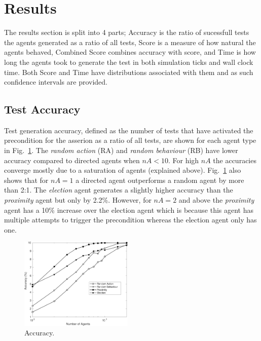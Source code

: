 \documentclass[letterpaper, 10 pt, journal, twoside]{IEEEtran}
\begin{document}
\section{Results}
The results section is split into 4 parts; Accuracy is the ratio of sucessfull tests the agents generated as a ratio of all tests, Score is a measure of how natural the agents behaved, Combined Score combines accuracy with score, and Time is how long the agents took to generate the test in both simulation ticks and wall clock time. Both Score and Time have distributions associated with them and as such confidence intervals are provided.



\subsection{Test Accuracy}
Test generation accuracy, defined as the number of tests that have activated the precondition for the asserion as a ratio of all tests, are shown for each agent type in Fig.~\ref{Accuracy}. The \textit{random action} (RA) and \textit{random behaviour} (RB) have lower accuracy compared to directed agents when $nA<10$. For high $nA$ the accuracies converge mostly due to a saturation of agents (explained above).
%
Fig.~\ref{Accuracy} also shows that for $nA=1$ a directed agent outperforms a random agent by more than 2:1. The \textit{election} agent generates a slightly higher accuracy than the \textit{proximity} agent but only by 2.2\%. However, for $nA=2$ and above the \textit{proximity} agent has a 10\% increase over the election agent which is because this agent has multiple attempts to trigger the precondition whereas the election agent only has one.


\begin{figure}[!t]
	\centering
\includegraphics[width=0.48\textwidth]{Accuracy.pdf}
	\caption{Accuracy.}
	\label{Accuracy}
\end{figure}
\end{document}
